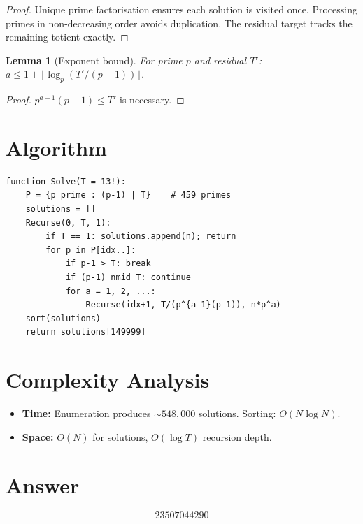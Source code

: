 \documentclass[12pt]{article}
\newtheorem{lemma}[theorem]{Lemma}
\begin{document}
\begin{proof}
Unique prime factorisation ensures each solution is visited once. Processing primes in non-decreasing order avoids duplication. The residual target tracks the remaining totient exactly.
\end{proof}

\begin{lemma}[Exponent bound]\label{lem:exp}
For prime $p$ and residual $T'$: $a\le 1+\lfloor\log_p(T'/(p-1))\rfloor$.
\end{lemma}

\begin{proof}
$p^{a-1}(p-1)\le T'$ is necessary.
\end{proof}

\section{Algorithm}

\begin{verbatim}
function Solve(T = 13!):
    P = {p prime : (p-1) | T}    # 459 primes
    solutions = []
    Recurse(0, T, 1):
        if T == 1: solutions.append(n); return
        for p in P[idx..]:
            if p-1 > T: break
            if (p-1) nmid T: continue
            for a = 1, 2, ...:
                Recurse(idx+1, T/(p^{a-1}(p-1)), n*p^a)
    sort(solutions)
    return solutions[149999]
\end{verbatim}

\section{Complexity Analysis}

\begin{itemize}
\item \textbf{Time:} Enumeration produces $\sim 548{,}000$ solutions. Sorting: $O(N\log N)$.
\item \textbf{Space:} $O(N)$ for solutions, $O(\log T)$ recursion depth.
\end{itemize}

\section{Answer}

\[
\boxed{23507044290}
\]
\end{document}
